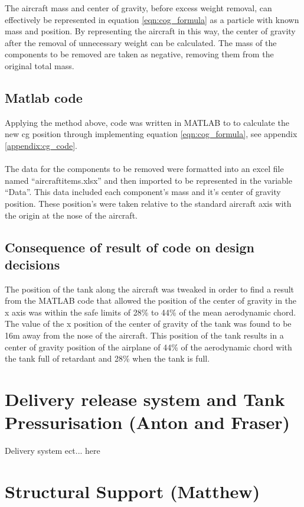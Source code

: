 The aircraft mass and center of gravity, before excess weight removal, can effectively be represented in equation \ref{eqn:cog_formula} as a particle with known mass and position.
By representing the aircraft in this way, the center of gravity after the removal of unnecessary weight can be calculated.
The mass of the components to be removed are taken as negative, removing them from the original total mass.

\subsection{Matlab code}
Applying the method above, code was written in MATLAB to to calculate the new cg position through implementing equation \ref{eqn:cog_formula}, see appendix \ref{appendix:cg_code}. \\  \\
The data for the components to be removed were formatted into an excel file named “aircraftitems.xlsx” and then imported to be represented in the variable “Data”.
This data included each component's mass and it's center of gravity position.
These position's were taken relative to the standard aircraft axis with the origin at the nose of the aircraft.

\subsection{Consequence of result of code on design decisions}

The position of the tank along the aircraft was tweaked in order to find a result from the MATLAB code that allowed the position of the center of gravity in the x axis was within the safe limits of 28\% to 44\% of the mean aerodynamic chord.
The value of the x position of the center of gravity of the tank was found to be 16m away from the nose of the aircraft.
This position of the tank results in a center of gravity position of the airplane of 44\% of the aerodynamic chord with the tank full of retardant and 28\% when the tank is full. 

\section{Delivery release system and  Tank Pressurisation (Anton and Fraser)}
Delivery system ect... here
\section{Structural Support (Matthew)}

